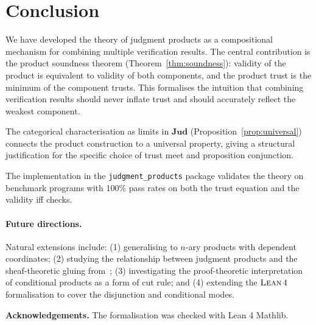 \documentclass[11pt]{article}
\newcommand{\ProdCat}{\mathbf{Jud}}               %
\begin{document}
\section{Conclusion}\label{sec:conclusion}

We have developed the theory of judgment products as a compositional
mechanism for combining multiple verification results.  The central
contribution is the product soundness theorem (Theorem~\ref{thm:soundness}):
validity of the product is equivalent to validity of both components,
and the product trust is the minimum of the component trusts.  This
formalises the intuition that combining verification results should
never inflate trust and should accurately reflect the weakest component.

The categorical characterisation as limits in $\ProdCat$
(Proposition~\ref{prop:universal}) connects the product construction
to a universal property, giving a structural justification for the
specific choice of trust meet and proposition conjunction.

The implementation in the \texttt{judgment\_products} package validates
the theory on \ppFortyFourTotalPrograms{} benchmark programs with 100\% pass rates on
both the trust equation and the validity iff checks.

\paragraph{Future directions.}
Natural extensions include: (1) generalising to $n$-ary products with
dependent coordinates; (2) studying the relationship between judgment
products and the sheaf-theoretic gluing from~\cite{jugeo01,jugeo03};
(3) investigating the proof-theoretic interpretation of conditional
products as a form of cut rule; and (4) extending the $\textsc{Lean}\,4{}$
formalisation to cover the disjunction and conditional modes.

\medskip
\noindent\textbf{Acknowledgements.}
The \LEAN{} formalisation was checked with Lean 4 Mathlib.
\end{document}
